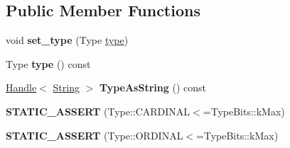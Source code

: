\subsection*{Public Member Functions}
\begin{DoxyCompactItemize}
\item 
\mbox{\label{classv8_1_1internal_1_1JSPluralRules_a4902e8bdd4c895c34b5984cbb1ade155}} 
void {\bfseries set\+\_\+type} (Type \mbox{\hyperlink{classstd_1_1conditional_1_1type}{type}})
\item 
\mbox{\label{classv8_1_1internal_1_1JSPluralRules_ab867b8cb53b0773a74b2ad105fb1fe85}} 
Type {\bfseries type} () const
\item 
\mbox{\label{classv8_1_1internal_1_1JSPluralRules_ac520eea381d44c2007d28ed097b329b5}} 
\mbox{\hyperlink{classv8_1_1internal_1_1Handle}{Handle}}$<$ \mbox{\hyperlink{classv8_1_1internal_1_1String}{String}} $>$ {\bfseries Type\+As\+String} () const
\item 
\mbox{\label{classv8_1_1internal_1_1JSPluralRules_aac0f30adb6e40c7248a5a9cffab0a1f2}} 
{\bfseries S\+T\+A\+T\+I\+C\+\_\+\+A\+S\+S\+E\+RT} (Type\+::\+C\+A\+R\+D\+I\+N\+AL$<$=Type\+Bits\+::k\+Max)
\item 
\mbox{\label{classv8_1_1internal_1_1JSPluralRules_a24bcf468b329ff019f39ee0d030dd491}} 
{\bfseries S\+T\+A\+T\+I\+C\+\_\+\+A\+S\+S\+E\+RT} (Type\+::\+O\+R\+D\+I\+N\+AL$<$=Type\+Bits\+::k\+Max)
\end{DoxyCompactItemize}
